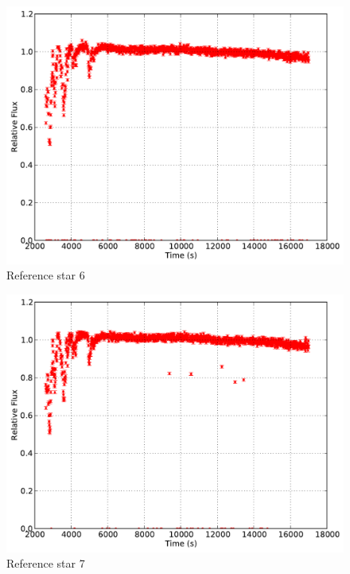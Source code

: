 \documentclass{aastex61}
\begin{document}
\begin{figure}[h]
	\centering
	\includegraphics[scale = .45]{exo_curves6.pdf}
	\caption{Reference star 6}
	\label{fig: refcurve6}
\end{figure}
\begin{figure}[h]
	\centering
	\includegraphics[scale = .45]{exo_curves7.pdf}
	\caption{Reference star 7}
	\label{fig: refcurve7}
\end{figure}
\end{document}
